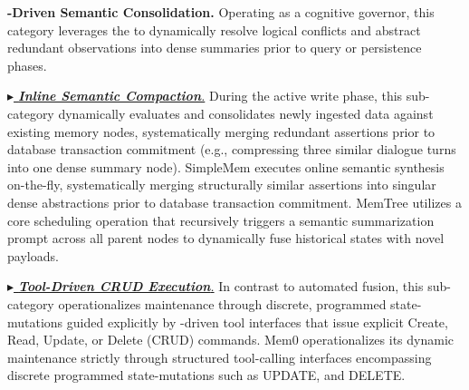 

\noindent {} \textbf{\llm-Driven Semantic Consolidation.}
Operating as a cognitive governor, this category leverages the \llm to dynamically resolve logical conflicts and abstract redundant observations into dense summaries prior to query or persistence phases.

\begin{sloppypar}
\noindent \underline{\textit{$\blacktriangleright$ \textbf{Inline Semantic Compaction}.}}
During the active write phase, this sub-category dynamically evaluates and consolidates newly ingested data against existing memory nodes, systematically merging redundant assertions prior to database transaction commitment (e.g., compressing three similar dialogue turns into one dense summary node).
SimpleMem executes online semantic synthesis on-the-fly, systematically merging structurally similar assertions into singular dense abstractions prior to database transaction commitment. MemTree utilizes a core scheduling operation that recursively triggers a semantic summarization prompt across all parent nodes to dynamically fuse historical states with novel payloads.
\end{sloppypar}


\begin{sloppypar}
\noindent \underline{\textit{$\blacktriangleright$ \textbf{Tool-Driven CRUD Execution}.}}
In contrast to automated fusion, this sub-category operationalizes maintenance through discrete, programmed state-mutations guided explicitly by \llm-driven tool interfaces that issue explicit Create, Read, Update, or Delete (CRUD) commands. Mem0 operationalizes its dynamic maintenance strictly through structured \llm tool-calling interfaces encompassing discrete programmed state-mutations such as UPDATE, and DELETE.
\end{sloppypar}

